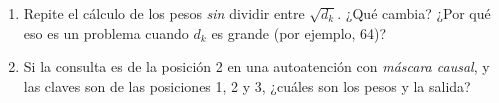 \documentclass[11pt]{article}
\newcommand{\espacio}[1]{\par\vspace{#1}}
\begin{document}
\begin{enumerate}
\begin{enumerate}
  \item Repite el cálculo de los pesos \emph{sin} dividir entre $\sqrt{d_k}$. ¿Qué cambia? ¿Por qué eso es un problema cuando $d_k$ es grande (por ejemplo, 64)?
  \espacio{2.5cm}

  \item Si la consulta es de la posición 2 en una autoatención con \emph{máscara causal}, y las claves son de las posiciones 1, 2 y 3, ¿cuáles son los pesos y la salida?
  \espacio{2.2cm}
\end{enumerate}

\end{enumerate}
\end{document}
